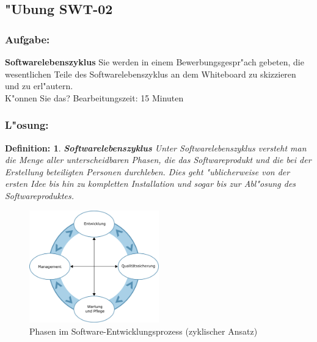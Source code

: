 \newtheorem{defi}{Definition:}
\newpage
\subsection{"Ubung SWT-02}
\subsubsection*{Aufgabe:}

\begin{framed}
\textbf{Softwarelebenszyklus}
\smallbreak
Sie werden in einem Bewerbungsgespr"ach gebeten, die wesentlichen Teile des Softwarelebenszyklus an dem Whiteboard zu skizzieren und zu erl"autern.
\\ K"onnen Sie das?
\bigbreak
\small Bearbeitungszeit: 15 Minuten
\end{framed}
\bigbreak
\bigbreak
\subsubsection*{L"osung:}

\begin{defi}
  \textbf{Softwarelebenszyklus}
  \smallbreak
  Unter Softwarelebenszyklus versteht man die Menge aller unterscheidbaren Phasen, die das Softwareprodukt und die bei der Erstellung beteiligten Personen durchleben. Dies geht "ublicherweise von der ersten Idee bis hin zu kompletten Installation und sogar bis zur Abl"osung des Softwareproduktes.
\end{defi}
\smallbreak

\begin{figure}[H]
  \centering
  \includegraphics[width=0.5\textwidth]{./images/AbbEntwicklgProzess.png}
  \captionsetup{name=Abb.,font=footnotesize}
  \caption{Phasen im Software-Entwicklungsprozess (zyklischer Ansatz)}
\end{figure}
\newpage


